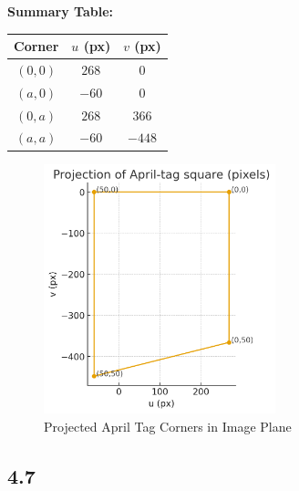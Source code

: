 \documentclass[12pt]{article}
\begin{document}
\textbf{Summary Table:}

\begin{center}
\begin{tabular}{c c c}
\toprule
Corner & $u$ (px) & $v$ (px) \\
\midrule
$(0,0)$   & $268$   & $0$     \\
$(a,0)$   & $-60$   & $0$     \\
$(0,a)$   & $268$   & $366$   \\
$(a,a)$   & $-60$   & $-448$  \\
\bottomrule
\end{tabular}
\end{center}

\begin{figure}[H]
    \centering
    \includegraphics[width=0.6\textwidth]{./media/tag_quadrilateral.png}
    \caption{Projected April Tag Corners in Image Plane}
    \label{fig:tag_projection}
\end{figure}

\subsection*{4.7}
\end{document}
